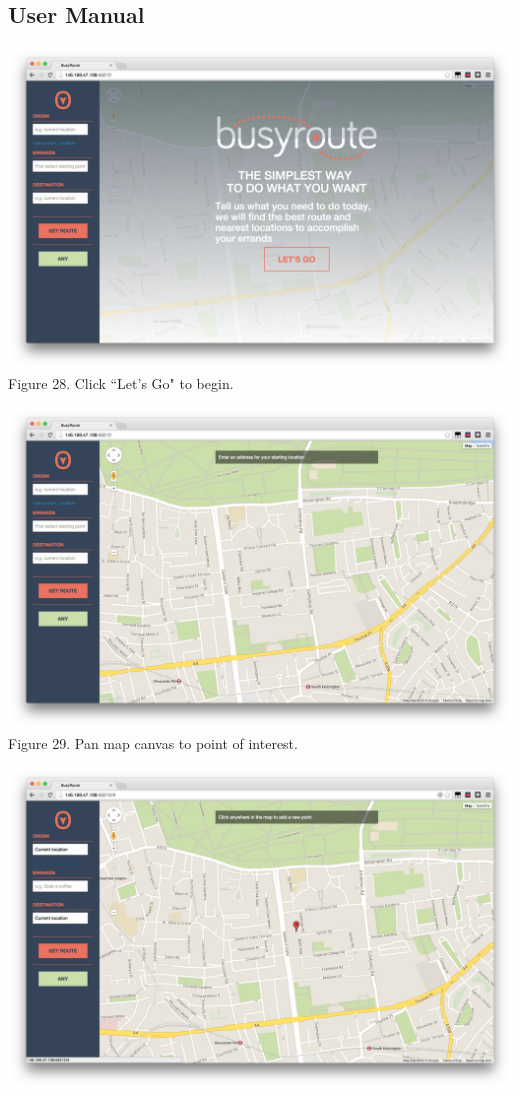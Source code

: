 \documentclass[a4paper, 10pt]{report}
\begin{document}
\begin{appendices}
\chapter{User Manual}
\begin{center}
\includegraphics[scale=0.18]{um-01-starting.png}\\
Figure 28. Click ``Let's Go" to begin.
\end{center}
\begin{center}
\includegraphics[scale=0.18]{um-02-clean.png}\\
Figure 29. Pan map canvas to point of interest.
\end{center}
\begin{center}
\includegraphics[scale=0.18]{um-03-current-loc.png}\\

\end{center}
\end{appendices}
\end{document}
